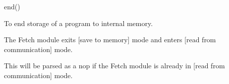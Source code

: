 

\format
end()

\purpose

To end storage of a program to internal memory.

\description

The Fetch module exits [save to memory] mode and enters [read from communication] mode.

\notes

This will be parsed as a nop if the Fetch module is already in [read from communication] mode.
